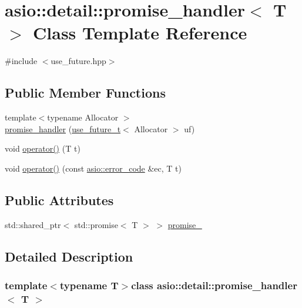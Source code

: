 \hypertarget{classasio_1_1detail_1_1promise__handler}{}\section{asio\+:\+:detail\+:\+:promise\+\_\+handler$<$ T $>$ Class Template Reference}
\label{classasio_1_1detail_1_1promise__handler}


{\ttfamily \#include $<$use\+\_\+future.\+hpp$>$}

\subsection*{Public Member Functions}
\begin{DoxyCompactItemize}
\item 
{\footnotesize template$<$typename Allocator $>$ }\\\hyperlink{classasio_1_1detail_1_1promise__handler_a1b3c5120fe5c917f6ce4ee6beac524e3}{promise\+\_\+handler} (\hyperlink{classasio_1_1use__future__t}{use\+\_\+future\+\_\+t}$<$ Allocator $>$ uf)
\item 
void \hyperlink{classasio_1_1detail_1_1promise__handler_a65feb728ee2cd0d59a599b34a2ac8eff}{operator()} (T t)
\item 
void \hyperlink{classasio_1_1detail_1_1promise__handler_a0ad4f18058eedbf29ca109bf3e36e8d4}{operator()} (const \hyperlink{classasio_1_1error__code}{asio\+::error\+\_\+code} \&ec, T t)
\end{DoxyCompactItemize}
\subsection*{Public Attributes}
\begin{DoxyCompactItemize}
\item 
std\+::shared\+\_\+ptr$<$ std\+::promise$<$ T $>$ $>$ \hyperlink{classasio_1_1detail_1_1promise__handler_a996b0e878a20b28688b682514c62f103}{promise\+\_\+}
\end{DoxyCompactItemize}


\subsection{Detailed Description}
\subsubsection*{template$<$typename T$>$class asio\+::detail\+::promise\+\_\+handler$<$ T $>$}




